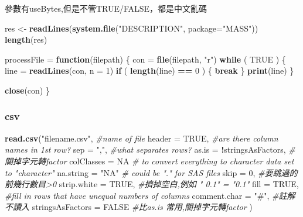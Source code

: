 \documentclass[]{book}
\newenvironment{Shaded}{\begin{snugshade}}{\end{snugshade}}
\newcommand{\CommentTok}[1]{\textcolor[rgb]{0.56,0.35,0.01}{\textit{#1}}}
\newcommand{\ControlFlowTok}[1]{\textcolor[rgb]{0.13,0.29,0.53}{\textbf{#1}}}
\newcommand{\DataTypeTok}[1]{\textcolor[rgb]{0.13,0.29,0.53}{#1}}
\newcommand{\DecValTok}[1]{\textcolor[rgb]{0.00,0.00,0.81}{#1}}
\newcommand{\KeywordTok}[1]{\textcolor[rgb]{0.13,0.29,0.53}{\textbf{#1}}}
\newcommand{\NormalTok}[1]{#1}
\newcommand{\OperatorTok}[1]{\textcolor[rgb]{0.81,0.36,0.00}{\textbf{#1}}}
\newcommand{\OtherTok}[1]{\textcolor[rgb]{0.56,0.35,0.01}{#1}}
\newcommand{\StringTok}[1]{\textcolor[rgb]{0.31,0.60,0.02}{#1}}
\theoremstyle{definition}
\theoremstyle{definition}
\theoremstyle{definition}
\theoremstyle{remark}
\begin{document}
參數有useBytes,但是不管TRUE/FALSE，都是中文亂碼

\begin{Shaded}
\begin{Highlighting}[]
\NormalTok{res <-}\StringTok{ }\KeywordTok{readLines}\NormalTok{(}\KeywordTok{system.file}\NormalTok{(}\StringTok{"DESCRIPTION"}\NormalTok{, }\DataTypeTok{package=}\StringTok{"MASS"}\NormalTok{))}
\KeywordTok{length}\NormalTok{(res)}
\end{Highlighting}
\end{Shaded}

\begin{Shaded}
\begin{Highlighting}[]
\NormalTok{processFile =}\StringTok{ }\ControlFlowTok{function}\NormalTok{(filepath) \{}
\NormalTok{  con =}\StringTok{ }\KeywordTok{file}\NormalTok{(filepath, }\StringTok{"r"}\NormalTok{)}
  \ControlFlowTok{while}\NormalTok{ ( }\OtherTok{TRUE}\NormalTok{ ) \{}
\NormalTok{    line =}\StringTok{ }\KeywordTok{readLines}\NormalTok{(con, }\DataTypeTok{n =} \DecValTok{1}\NormalTok{)}
    \ControlFlowTok{if}\NormalTok{ ( }\KeywordTok{length}\NormalTok{(line) }\OperatorTok{==}\StringTok{ }\DecValTok{0}\NormalTok{ ) \{}
      \ControlFlowTok{break}
\NormalTok{    \}}
    \KeywordTok{print}\NormalTok{(line)}
\NormalTok{  \}}

  \KeywordTok{close}\NormalTok{(con)}
\NormalTok{\}}
\end{Highlighting}
\end{Shaded}

\hypertarget{csv}{%
\subsubsection{csv}\label{csv}}

\begin{Shaded}
\begin{Highlighting}[]
\KeywordTok{read.csv}\NormalTok{(}\StringTok{"filename.csv"}\NormalTok{, }\CommentTok{#name of file}
         \DataTypeTok{header =} \OtherTok{TRUE}\NormalTok{, }\CommentTok{#are there column names in 1st row?}
         \DataTypeTok{sep =} \StringTok{","}\NormalTok{, }\CommentTok{#what separates rows?}
         \DataTypeTok{as.is =} \OperatorTok{!}\NormalTok{stringsAsFactors, }\CommentTok{#關掉字元轉factor}
         \DataTypeTok{colClasses =} \OtherTok{NA} \CommentTok{# to convert everything to character data set to "character"}
         \DataTypeTok{na.string =} \StringTok{"NA"} \CommentTok{# could be "." for SAS files}
         \DataTypeTok{skip =} \DecValTok{0}\NormalTok{, }\CommentTok{#要跳過的前幾行數目>0}
         \DataTypeTok{strip.white =} \OtherTok{TRUE}\NormalTok{, }\CommentTok{#擠掉空白,例如 " 0.1" = "0.1"}
         \DataTypeTok{fill =} \OtherTok{TRUE}\NormalTok{, }\CommentTok{#fill in rows that have unequal numbers of columns}
         \DataTypeTok{comment.char =} \StringTok{"#"}\NormalTok{, }\CommentTok{#註解不讀入}
         \DataTypeTok{stringsAsFactors =} \OtherTok{FALSE} \CommentTok{#比as.is 常用,關掉字元轉factor}
\NormalTok{         )}
\end{Highlighting}
\end{Shaded}
\end{document}
